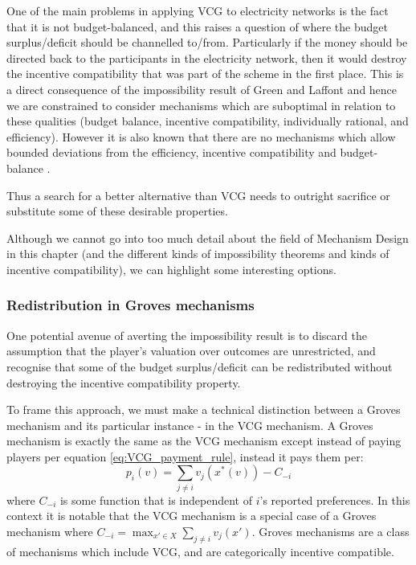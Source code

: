One of the main problems in applying VCG to electricity networks is the fact that it is not budget-balanced, and this raises a question of where the budget surplus/deficit should be channelled to/from.
Particularly if the money should be directed back to the participants in the electricity network, then it would destroy the incentive compatibility that was part of the scheme in the first place.
This is a direct consequence of the impossibility result of Green and Laffont \cite{29088} and hence we are constrained to consider mechanisms which are suboptimal in relation to these qualities (budget balance, incentive compatibility, individually rational, and efficiency).
However it is also known that there are no mechanisms which allow bounded deviations from the efficiency, incentive compatibility and budget-balance \cite{YI201679}.

Thus a search for a better alternative than VCG needs to outright sacrifice or substitute some of these desirable properties.

Although we cannot go into too much detail about the field of Mechanism Design in this chapter (and the different kinds of impossibility theorems and kinds of incentive compatibility), we can highlight some interesting options.

\subsubsection*{Redistribution in Groves mechanisms}

One potential avenue of averting the impossibility result is to discard the assumption that the player's valuation over outcomes are unrestricted, and recognise that some of the budget surplus/deficit can be redistributed without destroying the incentive compatibility property.

To frame this approach, we must make a technical distinction between a Groves mechanism and its particular instance - in the VCG mechanism.
A Groves mechanism is exactly the same as the VCG mechanism except instead of paying players per equation \ref{eq:VCG_payment_rule}, instead it pays them per:
\begin{equation}\label{eq:Groves_payment_equation} p_i(v)=\sum_{j\ne i}v_j(x^*(v)) - C_{-i} \end{equation}
where $C_{-i}$ is some function that is independent of $i$'s reported preferences.
In this context it is notable that the VCG mechanism is a special case of a Groves mechanism where $C_{-i}= \max_{x'\in X}\sum_{j\ne i}v_j(x')$. \cite{10.2307/1914085}
Groves mechanisms are a class of mechanisms which include VCG, and are categorically incentive compatible. 

